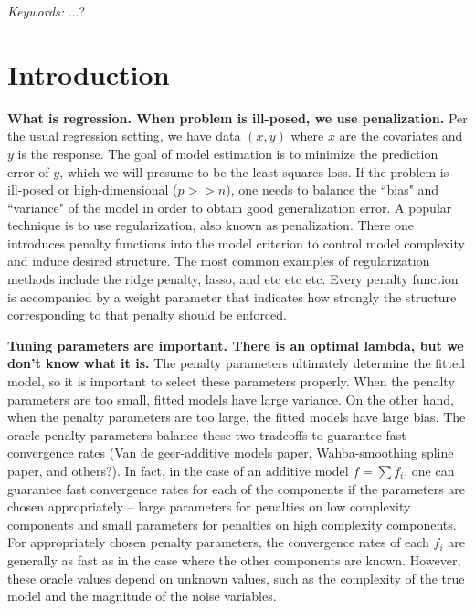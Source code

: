 \documentclass[12pt]{article}
\begin{document}
\noindent%
{\it Keywords:}  ...?
\vfill

\newpage
{} %
\section{Introduction}

\textbf{What is regression. When problem is ill-posed, we use penalization.}
Per the usual regression setting, we have data $(x,y)$ where $x$ are the covariates and $y$ is the response. The goal of model estimation is to minimize the prediction error of $y$, which we will presume to be the least squares loss. If the problem is ill-posed or high-dimensional ($p >> n$), one needs to balance the ``bias" and ``variance" of the model in order to obtain good generalization error. A popular technique is to use regularization, also known as penalization. There one introduces penalty functions into the model criterion to control model complexity and induce desired structure. The most common examples of regularization methods include the ridge penalty, lasso, and etc etc etc. Every penalty function is accompanied by a weight parameter that indicates how strongly the structure corresponding to that penalty should be enforced.

\textbf{Tuning parameters are important. There is an optimal lambda, but we don't know what it is.}
The penalty parameters ultimately determine the fitted model, so it is important to select these parameters properly. When the penalty parameters are too small, fitted models have large variance. On the other hand, when the penalty parameters are too large, the fitted models have large bias. The oracle penalty parameters balance these two tradeoffs to guarantee fast convergence rates (Van de geer-additive models paper, Wahba-smoothing spline paper, and others?). In fact, in the case of an additive model $f = \sum f_i$, one can guarantee fast convergence rates for each of the components if the parameters are chosen appropriately -- large parameters for penalties on low complexity components and small parameters for penalties on high complexity components. For appropriately chosen penalty parameters, the convergence rates of each $f_i$ are generally as fast as in the case where the other components are known. However, these oracle values depend on unknown values, such as the complexity of the true model and the magnitude of the noise variables.
\end{document}
